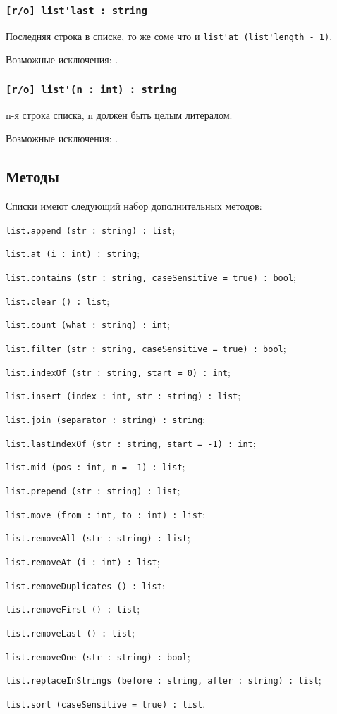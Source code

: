 \subsubsection{\lstinline|[r/o] list'last : string|}

Последняя строка в списке, то же соме что и \lstinline|list'at (list'length - 1)|.

Возможные исключения: .

\subsubsection{\lstinline|[r/o] list'(n : int) : string|}

n-я строка списка, n должен быть целым литералом.

Возможные исключения: .

\subsection{Методы}

Списки имеют следующий набор дополнительных методов:
\begin{icItems}
\item \lstinline|list.append (str : string) : list|;
\item \lstinline|list.at (i : int) : string|;
\item \lstinline|list.contains (str : string, caseSensitive = true) : bool|;
\item \lstinline|list.clear () : list|;
\item \lstinline|list.count (what : string) : int|;
\item \lstinline|list.filter (str : string, caseSensitive = true) : bool|;
\item \lstinline|list.indexOf (str : string, start = 0) : int|;
\item \lstinline|list.insert (index : int, str : string) : list|;
\item \lstinline|list.join (separator : string) : string|;
\item \lstinline|list.lastIndexOf (str : string, start = -1) : int|;
\item \lstinline|list.mid (pos : int, n = -1) : list|;
\item \lstinline|list.prepend (str : string) : list|;
\item \lstinline|list.move (from : int, to : int) : list|;
\item \lstinline|list.removeAll (str : string) : list|;
\item \lstinline|list.removeAt (i : int) : list|;
\item \lstinline|list.removeDuplicates () : list|;
\item \lstinline|list.removeFirst () : list|;
\item \lstinline|list.removeLast () : list|;
\item \lstinline|list.removeOne (str : string) : bool|;
\item \lstinline|list.replaceInStrings (before : string, after : string) : list|;
\item \lstinline|list.sort (caseSensitive = true) : list|.
\end{icItems}

